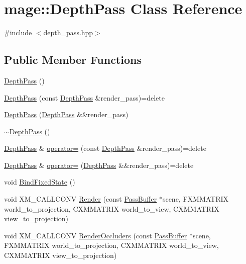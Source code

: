 \hypertarget{classmage_1_1_depth_pass}{}\section{mage\+:\+:Depth\+Pass Class Reference}
\label{classmage_1_1_depth_pass}


{\ttfamily \#include $<$depth\+\_\+pass.\+hpp$>$}

\subsection*{Public Member Functions}
\begin{DoxyCompactItemize}
\item 
\hyperlink{classmage_1_1_depth_pass_a16a23f6820a11faf9195b307474e355b}{Depth\+Pass} ()
\item 
\hyperlink{classmage_1_1_depth_pass_a9f0376b1423404dcced29535d59dd18c}{Depth\+Pass} (const \hyperlink{classmage_1_1_depth_pass}{Depth\+Pass} \&render\+\_\+pass)=delete
\item 
\hyperlink{classmage_1_1_depth_pass_af5755a8ee09bc528c0644f657558d71f}{Depth\+Pass} (\hyperlink{classmage_1_1_depth_pass}{Depth\+Pass} \&\&render\+\_\+pass)
\item 
\hyperlink{classmage_1_1_depth_pass_adc89d5da94b42294316d4ad1dfa09eb4}{$\sim$\+Depth\+Pass} ()
\item 
\hyperlink{classmage_1_1_depth_pass}{Depth\+Pass} \& \hyperlink{classmage_1_1_depth_pass_ac84074238d8ce69251fc2e6f294c5898}{operator=} (const \hyperlink{classmage_1_1_depth_pass}{Depth\+Pass} \&render\+\_\+pass)=delete
\item 
\hyperlink{classmage_1_1_depth_pass}{Depth\+Pass} \& \hyperlink{classmage_1_1_depth_pass_ab6a7d2abf0876f84591328d448ac1203}{operator=} (\hyperlink{classmage_1_1_depth_pass}{Depth\+Pass} \&\&render\+\_\+pass)=delete
\item 
void \hyperlink{classmage_1_1_depth_pass_ae456ab7e6818e86ab2c09338652c9be0}{Bind\+Fixed\+State} ()
\item 
void X\+M\+\_\+\+C\+A\+L\+L\+C\+O\+NV \hyperlink{classmage_1_1_depth_pass_a266e186a56e4a81b9a0e535dca143947}{Render} (const \hyperlink{structmage_1_1_pass_buffer}{Pass\+Buffer} $\ast$scene, F\+X\+M\+M\+A\+T\+R\+IX world\+\_\+to\+\_\+projection, C\+X\+M\+M\+A\+T\+R\+IX world\+\_\+to\+\_\+view, C\+X\+M\+M\+A\+T\+R\+IX view\+\_\+to\+\_\+projection)
\item 
void X\+M\+\_\+\+C\+A\+L\+L\+C\+O\+NV \hyperlink{classmage_1_1_depth_pass_a51609c054c2d036777a032018bd0cc70}{Render\+Occluders} (const \hyperlink{structmage_1_1_pass_buffer}{Pass\+Buffer} $\ast$scene, F\+X\+M\+M\+A\+T\+R\+IX world\+\_\+to\+\_\+projection, C\+X\+M\+M\+A\+T\+R\+IX world\+\_\+to\+\_\+view, C\+X\+M\+M\+A\+T\+R\+IX view\+\_\+to\+\_\+projection)
\end{DoxyCompactItemize}
